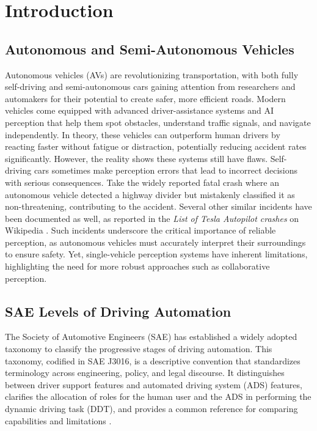 \chapter{Introduction}
\label{introduction}

\section{Autonomous and Semi-Autonomous Vehicles}
Autonomous vehicles (AVs) are revolutionizing transportation, with both fully self-driving and semi-autonomous cars gaining attention from researchers and automakers for their potential to create safer, more efficient roads.
Modern vehicles come equipped with advanced driver-assistance systems and AI perception that help them spot obstacles, understand traffic signals, and navigate independently.
In theory, these vehicles can outperform human drivers by reacting faster without fatigue or distraction, potentially reducing accident rates significantly.
However, the reality shows these systems still have flaws. 
Self-driving cars sometimes make perception errors that lead to incorrect decisions with serious consequences.  
Take the widely reported fatal crash where an autonomous vehicle detected a highway divider but mistakenly classified it as non-threatening, contributing to the accident.  
Several other similar incidents have been documented as well, as reported in the \emph{List of Tesla Autopilot crashes} on Wikipedia \cite{wiki:tesla_autopilot_crashes}.  
Such incidents underscore the critical importance of reliable perception, as autonomous vehicles must accurately interpret their surroundings to ensure safety.  
Yet, single-vehicle perception systems have inherent limitations, highlighting the need for more robust approaches such as collaborative perception.

\section{SAE Levels of Driving Automation}

The Society of Automotive Engineers (SAE) has established a widely adopted taxonomy to classify the progressive stages of driving automation. This taxonomy, codified in SAE J3016, is a descriptive convention that standardizes terminology across engineering, policy, and legal discourse. It distinguishes between driver support features and automated driving system (ADS) features, clarifies the allocation of roles for the human user and the ADS in performing the dynamic driving task (DDT), and provides a common reference for comparing capabilities and limitations \cite{SAEJ3016_2021}.

